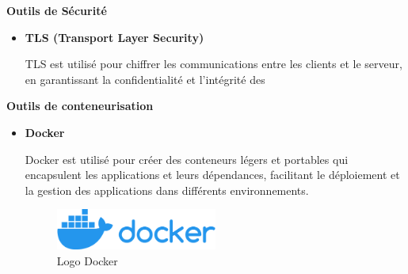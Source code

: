 \textbf{Outils de Sécurité}
\begin{itemize}

  \item \textbf{TLS (Transport Layer Security)}

    TLS est utilisé pour chiffrer les communications entre les clients et le
    serveur, en garantissant la confidentialité et l'intégrité des
\end{itemize}

%
%
%

\textbf{Outils de conteneurisation}
\begin{itemize}
  \item \textbf{Docker}

    Docker est utilisé pour créer des conteneurs légers et portables qui
    encapsulent les applications et leurs dépendances, facilitant le
    déploiement et la gestion des applications dans différents environnements.

    \begin{figure}[H]
      \centering
      \includegraphics[width=0.5\textwidth]{images/Docker_logo.svg.png}
      \caption{Logo Docker}
    \end{figure}
\end{itemize}

